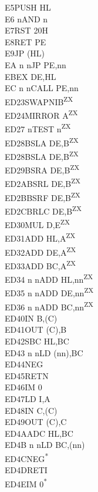 \documentclass[twoside,openright,a4paper]{book}
\begin{document}
\begin{multicols}{3}
{\begin{tabbing}
	E5\>PUSH HL\\
	E6 n\>AND n\\
	E7\>RST 20H\\
	E8\>RET PE\\
	E9\>JP (HL)\\
	EA n n\>JP PE,nn\\
	EB\>EX DE,HL\\
	EC n n\>CALL PE,nn\\
	ED23\>SWAPNIB\textsuperscript{ZX}\\
	ED24\>MIRROR A\textsuperscript{ZX}\\
	ED27 n\>TEST n\textsuperscript{ZX}\\
	ED28\>BSLA DE,B\textsuperscript{ZX}\\
	ED28\>BSLA DE,B\textsuperscript{ZX}\\
	ED29\>BSRA DE,B\textsuperscript{ZX}\\
	ED2A\>BSRL DE,B\textsuperscript{ZX}\\
	ED2B\>BSRF DE,B\textsuperscript{ZX}\\
	ED2C\>BRLC DE,B\textsuperscript{ZX}\\
	ED30\>MUL D,E\textsuperscript{ZX}\\
	ED31\>ADD HL,A\textsuperscript{ZX}\\
	ED32\>ADD DE,A\textsuperscript{ZX}\\
	ED33\>ADD BC,A\textsuperscript{ZX}\\
	ED34 n n\>ADD HL,nn\textsuperscript{ZX}\\
	ED35 n n\>ADD DE,nn\textsuperscript{ZX}\\
	ED36 n n\>ADD BC,nn\textsuperscript{ZX}\\
	ED40\>IN B,(C)\\
	ED41\>OUT (C),B\\
	ED42\>SBC HL,BC\\
	ED43 n n\>LD (nn),BC\\
	ED44\>NEG\\
	ED45\>RETN\\
	ED46\>IM 0\\
	ED47\>LD I,A\\
	ED48\>IN C,(C)\\
	ED49\>OUT (C),C\\
	ED4A\>ADC HL,BC\\
	ED4B n n\>LD BC,(nn)\\
	ED4C\>NEG\textsuperscript{*}\\
	ED4D\>RETI\\
	ED4E\>IM 0\textsuperscript{*}\\

\end{tabbing}}
\end{multicols}
\end{document}
